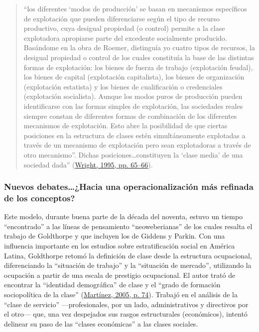 \documentclass[
]{article}
\begin{document}
\begin{quote}
``los diferentes `modos de producción' se basan en mecanismos específicos de explotación que pueden diferenciarse según el tipo de recurso productivo, cuya desigual propiedad (o control) permite a la clase explotadora apropiarse parte del excedente socialmente producido. Basándome en la obra de Roemer, distinguía yo cuatro tipos de recursos, la desigual propiedad o control de los cuales constituía la base de las distintas formas de explotación: los bienes de fuerza de trabajo (explotación feudal), los bienes de capital (explotación capitalista), los bienes de organización (explotación estatista) y los bienes de cualificación o credenciales (explotación socialista). Aunque los modos puros de producción pueden identificarse con las formas simples de explotación, las sociedades reales siempre constan de diferentes formas de combinación de los diferentes mecanismos de explotación. Esto abre la posibilidad de que ciertas posiciones en la estructura de clases estén simultáneamente explotadas a través de un mecanismo de explotación pero sean explotadoras a través de otro mecanismo''. Dichas posiciones\ldots constituyen la `clase media' de una sociedad dada'' (\protect\hyperlink{ref-Wright1995a}{Wright, 1995, pp. 65--66}).
\end{quote}

\hypertarget{nuevos-debateshacia-una-operacionalizaciuxf3n-muxe1s-refinada-de-los-conceptos}{%
\subsubsection{Nuevos debates\ldots¿Hacia una operacionalización más refinada de los conceptos?}\label{nuevos-debateshacia-una-operacionalizaciuxf3n-muxe1s-refinada-de-los-conceptos}}

Este modelo, durante buena parte de la década del noventa, estuvo un tiempo ``encontrado'' a las líneas de pensamiento ``neoweberianas'' de los cuales resalta el trabajo de Goldthorpe y que incluyen los de Giddens y Parkin. Con una influencia importante en los estudios sobre estratificación social en América Latina, Goldthorpe retomó la definición de clase desde la estructura ocupacional, diferenciando la ``situación de trabajo'' y la ``situación de mercado'', utilizando la ocupación a partir de una escala de prestigio ocupacional. El autor trató de encontrar la ``identidad demográfica'' de clase y el ``grado de formación sociopolítica de la clase'' (\protect\hyperlink{ref-Martinez2005}{Martínez, 2005, p. 74}). Trabajó en el análisis de la ``clase de servicio'' ---profesionales, por un lado, administrativos y directivos por el otro--- que, una vez despejados sus rasgos estructurales (económicos), intentó delinear su paso de las ``clases económicas'' a las clases sociales.
\end{document}
